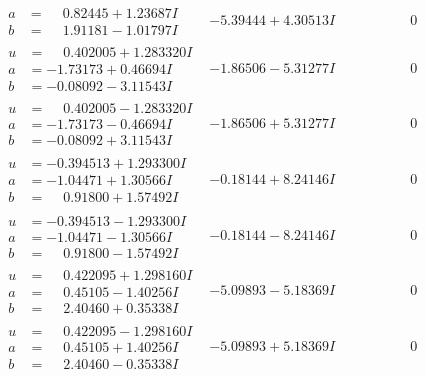 \documentclass[1p]{elsarticle_modified}
\theoremstyle{definition}
\begin{document}
$$\begin{array}{c|c|c}
\begin{aligned}
a &= \phantom{-}0.82445 + 1.23687 I \\
b &= \phantom{-}1.91181 - 1.01797 I\end{aligned}
 & -5.39444 + 4.30513 I & \phantom{-0.000000 } 0 \\ \hline\begin{aligned}
u &= \phantom{-}0.402005 + 1.283320 I \\
a &= -1.73173 + 0.46694 I \\
b &= -0.08092 - 3.11543 I\end{aligned}
 & -1.86506 - 5.31277 I & \phantom{-0.000000 } 0 \\ \hline\begin{aligned}
u &= \phantom{-}0.402005 - 1.283320 I \\
a &= -1.73173 - 0.46694 I \\
b &= -0.08092 + 3.11543 I\end{aligned}
 & -1.86506 + 5.31277 I & \phantom{-0.000000 } 0 \\ \hline\begin{aligned}
u &= -0.394513 + 1.293300 I \\
a &= -1.04471 + 1.30566 I \\
b &= \phantom{-}0.91800 + 1.57492 I\end{aligned}
 & -0.18144 + 8.24146 I & \phantom{-0.000000 } 0 \\ \hline\begin{aligned}
u &= -0.394513 - 1.293300 I \\
a &= -1.04471 - 1.30566 I \\
b &= \phantom{-}0.91800 - 1.57492 I\end{aligned}
 & -0.18144 - 8.24146 I & \phantom{-0.000000 } 0 \\ \hline\begin{aligned}
u &= \phantom{-}0.422095 + 1.298160 I \\
a &= \phantom{-}0.45105 - 1.40256 I \\
b &= \phantom{-}2.40460 + 0.35338 I\end{aligned}
 & -5.09893 - 5.18369 I & \phantom{-0.000000 } 0 \\ \hline\begin{aligned}
u &= \phantom{-}0.422095 - 1.298160 I \\
a &= \phantom{-}0.45105 + 1.40256 I \\
b &= \phantom{-}2.40460 - 0.35338 I\end{aligned}
 & -5.09893 + 5.18369 I & \phantom{-0.000000 } 0 \\ \hline\begin{aligned}

\end{aligned}
\end{array}$$
\end{document}
